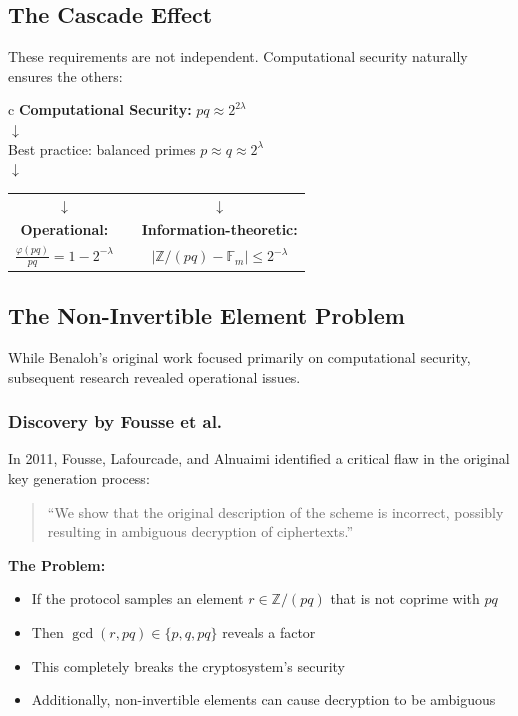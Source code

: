 \documentclass[11pt]{article}
\theoremstyle{definition}
\begin{document}
\subsection{The Cascade Effect}

These requirements are not independent. Computational security naturally ensures the others:

\begin{center}
\begin{tabular}{c}
\textbf{Computational Security:} $pq \approx 2^{2\lambda}$ \\
$\downarrow$ \\
Best practice: balanced primes $p \approx q \approx 2^{\lambda}$ \\
$\downarrow$ \\
\begin{tabular}{ccc}
$\downarrow$ & & $\downarrow$ \\
\textbf{Operational:} & & \textbf{Information-theoretic:} \\
$\frac{\varphi(pq)}{pq} = 1 - 2^{-\lambda}$ & & $|\mathbb{Z}/(pq) - \mathbb{F}_m| \leq 2^{-\lambda}$ \\
\end{tabular}
\end{tabular}
\end{center}

\subsection{The Non-Invertible Element Problem}

While Benaloh's original work \cite{benaloh1994dense} focused primarily on computational security, subsequent research revealed operational issues.

\subsubsection{Discovery by Fousse et al.}

In 2011, Fousse, Lafourcade, and Alnuaimi \cite{fousse2011benaloh} identified a critical flaw in the original key generation process:

\begin{quote}
``We show that the original description of the scheme is incorrect, possibly resulting in ambiguous decryption of ciphertexts.''
\end{quote}

\textbf{The Problem:}
\begin{itemize}
\item If the protocol samples an element $r \in \mathbb{Z}/(pq)$ that is not coprime with $pq$
\item Then $\gcd(r, pq) \in \{p, q, pq\}$ reveals a factor
\item This completely breaks the cryptosystem's security
\item Additionally, non-invertible elements can cause decryption to be ambiguous
\end{itemize}
\end{document}
